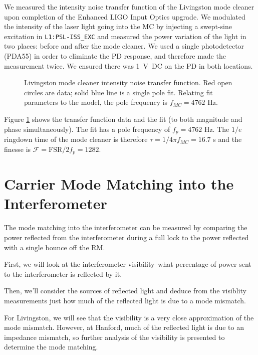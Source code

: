 We measured the intensity noise transfer function of the Livingston
mode cleaner upon completion of the Enhanced LIGO Input Optics
upgrade. We modulated the intensity of the laser light going into the
MC by injecting a swept-sine excitation in \texttt{L1:PSL-ISS\_EXC}
and measured the power variation of the light in two places: before
and after the mode cleaner. We used a single photodetector (PDA55) in
order to eliminate the PD response, and therefore made the measurement
twice. We ensured there was 1~V~DC on the PD in both locations.

\begin{figure}
\begin{centering}
\caption[Livingston mode cleaner intensity noise transfer
function]{Livingston mode cleaner intensity noise transfer
  function. Red open circles are data; solid blue line is a single
  pole fit. Relating fit parameters to the model, the pole frequency
  is $f_{MC}=4762$ Hz.}
\label{fig:mcpole}
\end{centering}
\end{figure}

Figure \ref{fig:mcpole} shows the transfer function data and the fit
(to both magnitude and phase simultaneously). The fit has a pole
frequency of $f_p=4762$ Hz. The $1/e$ ringdown time of the mode
cleaner is therefore $\tau = 1/4\pi f_{MC} = 16.7$ \micro s and the
finesse is $\mathcal{F} = \mathrm{FSR}/2f_p = 1282$.





\section{Carrier Mode Matching into the Interferometer}

The mode matching into the interferometer can be measured by comparing
the power reflected from the interferometer during a full lock to the
power reflected with a single bounce off the RM.

First, we will look at the interferometer visibility--what percentage
of power sent to the interferometer is reflected by it. 

Then, we'll
consider the sources of reflected light and deduce from the visiblity
measurements just how much of the reflected light is due to a mode
mismatch. 

For Livingston, we will see that the visibility is a very
close approximation of the mode mismatch. However, at Hanford, much of
the reflected light is due to an impedance mismatch, so further
analysis of the visibility is presented to determine the mode
matching.


